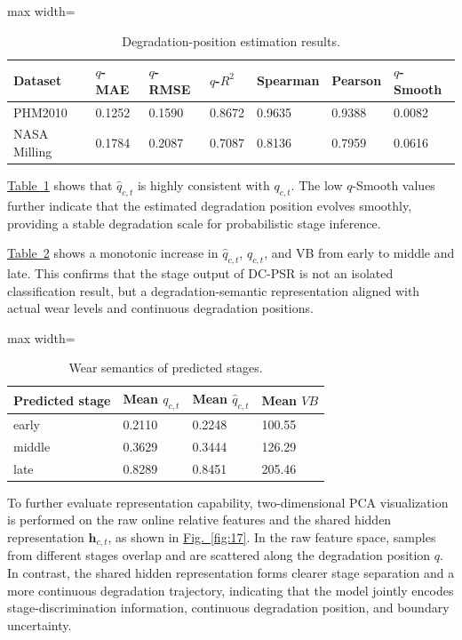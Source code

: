 \documentclass[a4paper,fleqn]{cas-sc}
\providecommand{\figref}{}
\renewcommand{\figref}[1]{\hyperref[#1]{Fig.~\ref*{#1}}}
\providecommand{\tabref}{}
\renewcommand{\tabref}[1]{\hyperref[#1]{Table~\ref*{#1}}}
\begin{document}
  \begin{table}[!htbp]
    \centering
    \scriptsize
  \caption{Degradation-position estimation results.}
    \label{tab:13}
    \begin{adjustbox}{max width=\textwidth}
      \begin{tabular}{lllllll}
        \toprule
        \textbf{Dataset} & \textbf{$q$-MAE} & \textbf{$q$-RMSE} & \textbf{$q$-$R^2$} & \textbf{Spearman} & \textbf{Pearson} & \textbf{$q$-Smooth} \\
        \midrule
        PHM2010 & 0.1252 & 0.1590 & 0.8672 & 0.9635 & 0.9388 & 0.0082 \\
        NASA Milling & 0.1784 & 0.2087 & 0.7087 & 0.8136 & 0.7959 & 0.0616 \\
        \bottomrule
      \end{tabular}
    \end{adjustbox}
  \end{table}
  \tabref{tab:13} shows that $\hat{q}_{c,t}$ is highly consistent with $q_{c,t}$. The low $q$-Smooth values further indicate that the estimated degradation position evolves smoothly, providing a stable degradation scale for probabilistic stage inference.

  \tabref{tab:14} shows a monotonic increase in $\hat{q}_{c,t}$, $q_{c,t}$, and VB from early to middle and late. This confirms that the stage output of DC-PSR is not an isolated classification result, but a degradation-semantic representation aligned with actual wear levels and continuous degradation positions.

  \begin{table}[!htbp]
    \centering
    \scriptsize
  \caption{Wear semantics of predicted stages.}
    \label{tab:14}
    \begin{adjustbox}{max width=\textwidth}
      \begin{tabular}{llll}
        \toprule
        \textbf{Predicted stage} & \textbf{Mean $q_{c,t}$} & \textbf{Mean $\hat{q}_{c,t}$} & \textbf{Mean $VB$} \\
        \midrule
        early & 0.2110 & 0.2248 & 100.55 \\
        middle & 0.3629 & 0.3444 & 126.29 \\
        late & 0.8289 & 0.8451 & 205.46 \\
        \bottomrule
      \end{tabular}
    \end{adjustbox}
  \end{table}
  To further evaluate representation capability, two-dimensional PCA visualization is performed on the raw online relative features and the shared hidden representation $\mathbf{h}_{c,t}$, as shown in \figref{fig:17}. In the raw feature space, samples from different stages overlap and are scattered along the degradation position $q$. In contrast, the shared hidden representation forms clearer stage separation and a more continuous degradation trajectory, indicating that the model jointly encodes stage-discrimination information, continuous degradation position, and boundary uncertainty.
\end{document}
